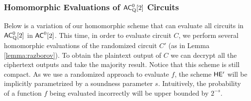 
\subsubsection{Homomorphic Evaluations of ${\mathsf{AC}}^0_{\text{Q}}[2]$ Circuits}

Below is a variation of our homomorphic scheme that can evaluate all circuits in ${\mathsf{AC}}^0_{\text{Q}}[2]$ in ${\mathsf{AC}}^0[2]$. This time, in order to evaluate circuit $C$, we perform several homomorphic evaluations of the randomized circuit $C'$ (as in Lemma \ref{lemma:razborov}). To obtain the plaintext output of $C$ we can decrypt all the ciphertext outputs and take the majority result. Notice that this scheme is still compact.
As we use a randomized approach to evaluate $f$, the scheme $\mathsf{HE'}$ will be implicitly parametrized by a soundness parameter $s$. Intuitively, the probability of a function $f$ being evaluated incorrectly will be upper bounded by $2^{-s}$.




